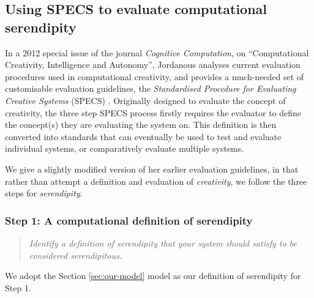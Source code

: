 \subsection{Using SPECS to evaluate computational serendipity}\label{specs-overview}

In a 2012 special issue of the journal {\em Cognitive Computation}, on
``Computational Creativity, Intelligence and Autonomy'', Jordanous
analyses current evaluation procedures used in computational
creativity, and provides a much-needed set of customisable evaluation
guidelines, the \emph{Standardised Procedure for Evaluating Creative
  Systems} (SPECS) \cite{jordanous:12}. Originally designed to evaluate the concept of creativity, the three step SPECS process firstly requires the evaluator to define the concept(s) they are evaluating the system on. This definition is then converted into standards that can eventually be used to test and evaluate individual systems, or comparatively evaluate multiple systems.

We give a slightly modified version of her earlier evaluation
guidelines, in that rather than attempt a definition and evaluation of
{\em creativity}, we follow the three steps for \emph{serendipity}.


\subsubsection*{Step 1: A computational definition of serendipity}
\begin{quote} {\em Identify a definition of serendipity that your
    system should satisfy to be considered serendipitous.}\end{quote}

\noindent We adopt the Section \ref{sec:our-model} model as our definition of serendipity for Step 1.

